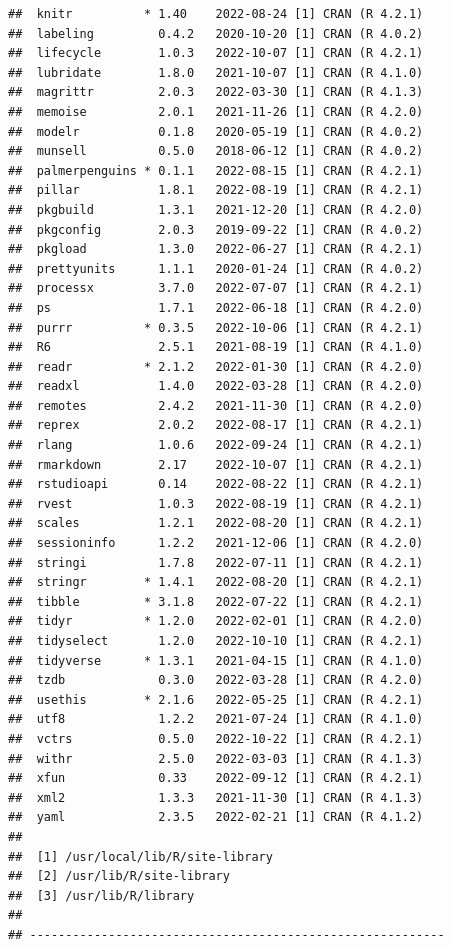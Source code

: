 \documentclass[print]{nuthesis}
\begin{document}
\begin{verbatim}
##  knitr          * 1.40    2022-08-24 [1] CRAN (R 4.2.1)
##  labeling         0.4.2   2020-10-20 [1] CRAN (R 4.0.2)
##  lifecycle        1.0.3   2022-10-07 [1] CRAN (R 4.2.1)
##  lubridate        1.8.0   2021-10-07 [1] CRAN (R 4.1.0)
##  magrittr         2.0.3   2022-03-30 [1] CRAN (R 4.1.3)
##  memoise          2.0.1   2021-11-26 [1] CRAN (R 4.2.0)
##  modelr           0.1.8   2020-05-19 [1] CRAN (R 4.0.2)
##  munsell          0.5.0   2018-06-12 [1] CRAN (R 4.0.2)
##  palmerpenguins * 0.1.1   2022-08-15 [1] CRAN (R 4.2.1)
##  pillar           1.8.1   2022-08-19 [1] CRAN (R 4.2.1)
##  pkgbuild         1.3.1   2021-12-20 [1] CRAN (R 4.2.0)
##  pkgconfig        2.0.3   2019-09-22 [1] CRAN (R 4.0.2)
##  pkgload          1.3.0   2022-06-27 [1] CRAN (R 4.2.1)
##  prettyunits      1.1.1   2020-01-24 [1] CRAN (R 4.0.2)
##  processx         3.7.0   2022-07-07 [1] CRAN (R 4.2.1)
##  ps               1.7.1   2022-06-18 [1] CRAN (R 4.2.0)
##  purrr          * 0.3.5   2022-10-06 [1] CRAN (R 4.2.1)
##  R6               2.5.1   2021-08-19 [1] CRAN (R 4.1.0)
##  readr          * 2.1.2   2022-01-30 [1] CRAN (R 4.2.0)
##  readxl           1.4.0   2022-03-28 [1] CRAN (R 4.2.0)
##  remotes          2.4.2   2021-11-30 [1] CRAN (R 4.2.0)
##  reprex           2.0.2   2022-08-17 [1] CRAN (R 4.2.1)
##  rlang            1.0.6   2022-09-24 [1] CRAN (R 4.2.1)
##  rmarkdown        2.17    2022-10-07 [1] CRAN (R 4.2.1)
##  rstudioapi       0.14    2022-08-22 [1] CRAN (R 4.2.1)
##  rvest            1.0.3   2022-08-19 [1] CRAN (R 4.2.1)
##  scales           1.2.1   2022-08-20 [1] CRAN (R 4.2.1)
##  sessioninfo      1.2.2   2021-12-06 [1] CRAN (R 4.2.0)
##  stringi          1.7.8   2022-07-11 [1] CRAN (R 4.2.1)
##  stringr        * 1.4.1   2022-08-20 [1] CRAN (R 4.2.1)
##  tibble         * 3.1.8   2022-07-22 [1] CRAN (R 4.2.1)
##  tidyr          * 1.2.0   2022-02-01 [1] CRAN (R 4.2.0)
##  tidyselect       1.2.0   2022-10-10 [1] CRAN (R 4.2.1)
##  tidyverse      * 1.3.1   2021-04-15 [1] CRAN (R 4.1.0)
##  tzdb             0.3.0   2022-03-28 [1] CRAN (R 4.2.0)
##  usethis        * 2.1.6   2022-05-25 [1] CRAN (R 4.2.1)
##  utf8             1.2.2   2021-07-24 [1] CRAN (R 4.1.0)
##  vctrs            0.5.0   2022-10-22 [1] CRAN (R 4.2.1)
##  withr            2.5.0   2022-03-03 [1] CRAN (R 4.1.3)
##  xfun             0.33    2022-09-12 [1] CRAN (R 4.2.1)
##  xml2             1.3.3   2021-11-30 [1] CRAN (R 4.1.3)
##  yaml             2.3.5   2022-02-21 [1] CRAN (R 4.1.2)
## 
##  [1] /usr/local/lib/R/site-library
##  [2] /usr/lib/R/site-library
##  [3] /usr/lib/R/library
## 
## ----------------------------------------------------------
\end{verbatim}
\end{document}
